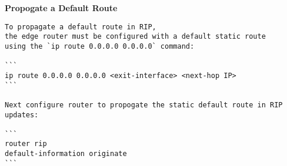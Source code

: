 \documentclass[../EngineeringJournal_CDavis.tex]{subfiles}
\begin{document}

\hspace{0.2cm}
\begin{tcolorbox}[width=6.3in]
{\bf{ Propogate a Default Route }}
\scriptsize
\begin{verbatim}
To propagate a default route in RIP, 
the edge router must be configured with a default static route 
using the `ip route 0.0.0.0 0.0.0.0` command:

```
ip route 0.0.0.0 0.0.0.0 <exit-interface> <next-hop IP>
```

Next configure router to propogate the static default route in RIP updates:

```
router rip
default-information originate
```
\end{verbatim}
\end{tcolorbox}
\hspace{0.2cm}
\normalsize  
\end{document}
